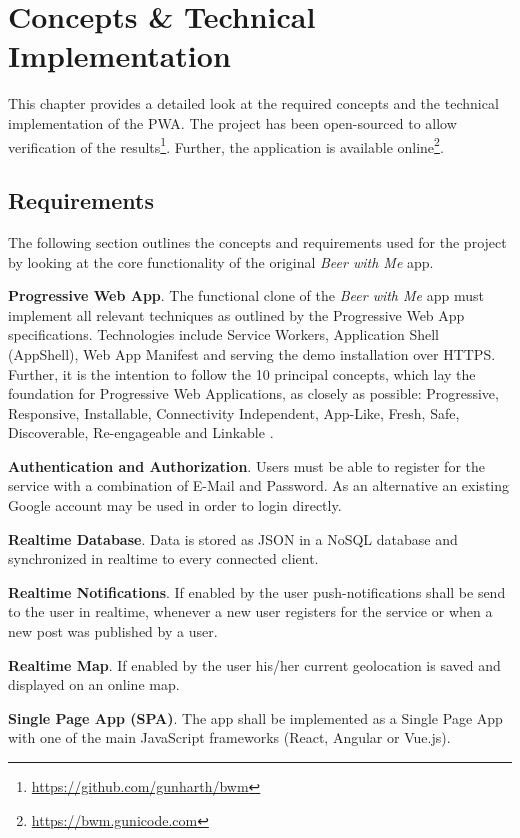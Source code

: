 \chapter{Concepts \& Technical Implementation}
This chapter provides a detailed look at the required concepts and the technical implementation of the PWA. The project has been open-sourced to allow verification of the results\footnote{\url{https://github.com/gunharth/bwm}}. Further, the application is available online\footnote{\url{https://bwm.gunicode.com}}.

\section{Requirements}

The following section outlines the concepts and requirements used for the project by looking at the core functionality of the original \textit{Beer with Me} app.

\textbf{Progressive Web App}. The functional clone of the \textit{Beer with Me} app must implement all relevant techniques as outlined by the Progressive Web App specifications. Technologies include Service Workers, Application Shell (AppShell), Web App Manifest and serving the demo installation over HTTPS. Further, it is the intention to follow the 10 principal concepts, which lay the foundation for Progressive Web Applications, as closely as possible: Progressive, Responsive, Installable, Connectivity Independent, App-Like, Fresh, Safe, Discoverable, Re-engageable and Linkable \citep{osmaniGettingStartedProgressive2015}.

\textbf{Authentication and Authorization}. Users must be able to register for the service with a combination of E-Mail and Password. As an alternative an existing Google account may be used in order to login directly.

\textbf{Realtime Database}. Data is stored as JSON in a NoSQL database and synchronized in realtime to every connected client.

\textbf{Realtime Notifications}. If enabled by the user push-notifications shall be send to the user in realtime, whenever a new user registers for the service or when a new post was published by a user.

\textbf{Realtime Map}. If enabled by the user his/her current geolocation is saved and displayed on an online map.

\textbf{Single Page App (SPA)}. The app shall be implemented as a Single Page App with one of the main JavaScript frameworks (React, Angular or Vue.js).

